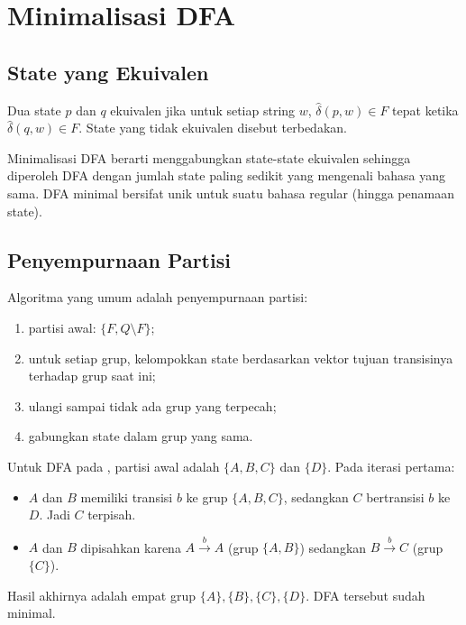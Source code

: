 \section{Minimalisasi DFA}
\label{sec:ch06-minimasi}

\subsection{State yang Ekuivalen}

\begin{definisi}
Dua state \(p\) dan \(q\) ekuivalen jika untuk setiap string \(w\),
\(\hat{\delta}(p,w) \in F\) tepat ketika
\(\hat{\delta}(q,w) \in F\). State yang tidak ekuivalen disebut
terbedakan.
\end{definisi}

Minimalisasi DFA berarti menggabungkan state-state ekuivalen sehingga
diperoleh DFA dengan jumlah state paling sedikit yang mengenali bahasa
yang sama. DFA minimal bersifat unik untuk suatu bahasa regular
(hingga penamaan state).

\subsection{Penyempurnaan Partisi}

Algoritma yang umum adalah penyempurnaan partisi:
\begin{enumerate}[label=\arabic*.,leftmargin=*]
  \item partisi awal: \(\{F, Q \setminus F\}\);
  \item untuk setiap grup, kelompokkan state berdasarkan vektor
        tujuan transisinya terhadap grup saat ini;
  \item ulangi sampai tidak ada grup yang terpecah;
  \item gabungkan state dalam grup yang sama.
\end{enumerate}

\begin{contoh}
Untuk DFA pada , partisi awal adalah
\(\{A,B,C\}\) dan \(\{D\}\). Pada iterasi pertama:
\begin{itemize}[leftmargin=*]
  \item \(A\) dan \(B\) memiliki transisi \(b\) ke grup
        \(\{A,B,C\}\), sedangkan \(C\) bertransisi \(b\) ke \(D\).
        Jadi \(C\) terpisah.
  \item \(A\) dan \(B\) dipisahkan karena \(A \xrightarrow{b} A\)
        (grup \(\{A,B\}\)) sedangkan \(B \xrightarrow{b} C\)
        (grup \(\{C\}\)).
\end{itemize}
Hasil akhirnya adalah empat grup \(\{A\}, \{B\}, \{C\}, \{D\}\).
DFA tersebut sudah minimal.
\end{contoh}

